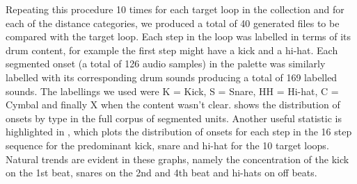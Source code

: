 Repeating this procedure 10 times for each target loop in the collection and for each of the distance categories, we produced a total of 40 generated files to be compared with the target loop. Each step in the loop was labelled in terms of its drum content, for example the first step might have a kick and a hi-hat. Each segmented onset (a total of 126 audio samples)  in the palette was similarly labelled with its corresponding drum sounds producing a total of 169 labelled sounds. The labellings we used were K = Kick, S = Snare, HH = Hi-hat, C = Cymbal and finally X when the content wasn’t clear.  shows the distribution of onsets by type in the full corpus of segmented units. Another useful statistic is highlighted in , which plots the distribution of onsets for each step in the 16 step sequence for the predominant kick, snare and hi-hat for the 10 target loops. Natural trends are evident in these graphs, namely the concentration of the kick on the 1st beat, snares on the 2nd and 4th beat and hi-hats on off beats.

